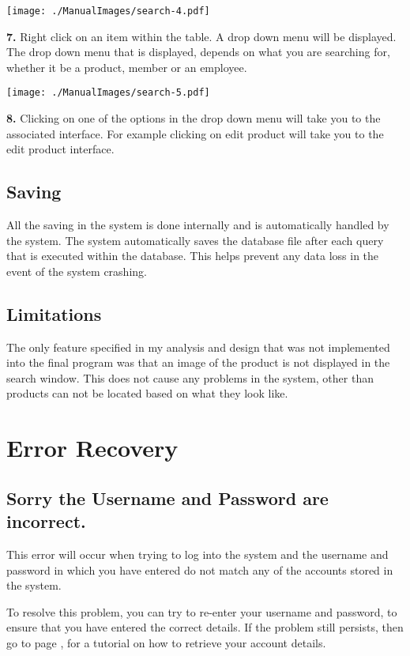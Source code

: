 \texttt{[image: ./ManualImages/search-4.pdf]}

\textbf{7.} Right click on an item within the table. A drop down menu will be displayed. The drop down menu that is displayed, depends on what you are searching for, whether it be a product, member or an employee.

\texttt{[image: ./ManualImages/search-5.pdf]}

\textbf{8.} Clicking on one of the options in the drop down menu will take you to the associated interface. For example clicking on edit product will take you to the edit product interface.


\subsection{Saving}

All the saving in the system is done internally and is automatically handled by the system. The system automatically saves the database file after each query that is executed within the database. This helps prevent any data loss in the event of the system crashing.

\subsection{Limitations}

The only feature specified in my analysis and design that was not implemented into the final program was that an image of the product is not displayed in the search window. This does not cause any problems in the system, other than products can not be located based on what they look like.

\section{Error Recovery}

\subsection{Sorry the Username and Password are incorrect.}

This error will occur when trying to log into the system and the username and password in which you have entered do not match any of the accounts stored in the system.

To resolve this problem, you can try to re-enter your username and password, to ensure that you have entered the correct details. If the problem still persists, then go to page \pageref{fig:Forgetting Your User-name or Password}, for a tutorial on how to retrieve your account details.

